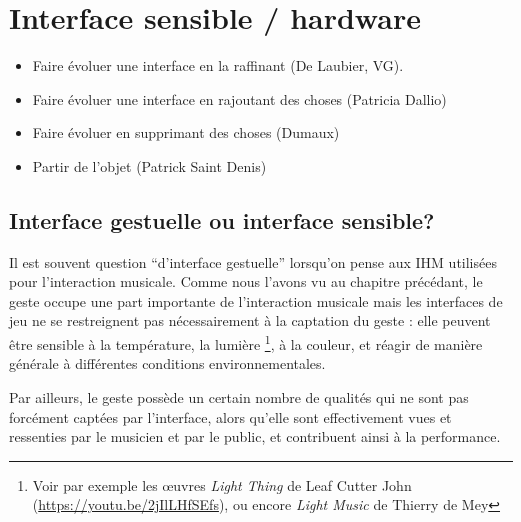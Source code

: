 %
\chapter{Interface sensible / hardware}
\label{ch:interfaces}




\vspace{-1em}
\begin{itemize}[noitemsep]
\item Faire évoluer une interface en la raffinant (De Laubier, VG).
\item Faire évoluer une interface en rajoutant des choses (Patricia Dallio)
\item Faire évoluer en supprimant des choses (Dumaux)
\item Partir de l'objet (Patrick Saint Denis)
\end{itemize}

\section{Interface gestuelle ou interface sensible?}
Il est souvent question ``d'interface gestuelle'' lorsqu'on pense aux \gls{IHM} utilisées pour l'interaction musicale. Comme nous l'avons vu au chapitre précédant, le geste occupe une part importante de l'interaction musicale mais les interfaces de jeu ne se restreignent pas nécessairement à la captation du geste : elle peuvent être sensible à la température, la lumière \footnote{Voir par exemple les œuvres \textit{Light Thing} de Leaf Cutter John (\url{https://youtu.be/2jIlLHfSEfs}), ou encore \textit{Light Music} de Thierry de Mey}, à la couleur, et réagir de manière générale à différentes conditions environnementales.

Par ailleurs, le geste possède un certain nombre de qualités qui ne sont pas forcément captées par l'interface, alors qu'elle sont effectivement vues et ressenties par le musicien et par le public, et contribuent ainsi à la performance.

